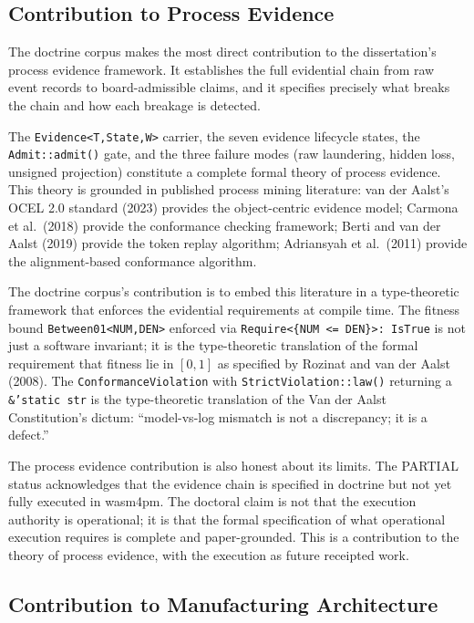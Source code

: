 \subsection{Contribution to Process Evidence}
\label{sec:doctrine-contribution-evidence}

The doctrine corpus makes the most direct contribution to the dissertation's process evidence
framework. It establishes the full evidential chain from raw event records to board-admissible
claims, and it specifies precisely what breaks the chain and how each breakage is detected.

The \texttt{Evidence\textless{}T,State,W\textgreater{}} carrier, the seven evidence lifecycle
states, the \texttt{Admit::admit()} gate, and the three failure modes (raw laundering, hidden
loss, unsigned projection) constitute a complete formal theory of process evidence. This
theory is grounded in published process mining literature: van der Aalst's OCEL 2.0 standard
(2023) provides the object-centric evidence model; Carmona et al.\ (2018) provide the
conformance checking framework; Berti and van der Aalst (2019) provide the token replay
algorithm; Adriansyah et al.\ (2011) provide the alignment-based conformance algorithm.

The doctrine corpus's contribution is to embed this literature in a type-theoretic framework
that enforces the evidential requirements at compile time. The fitness bound
\texttt{Between01\textless{}NUM,DEN\textgreater{}} enforced via \texttt{Require\textless{}\{NUM
<= DEN\}\textgreater{}: IsTrue} is not just a software invariant; it is the type-theoretic
translation of the formal requirement that fitness lie in $[0,1]$ as specified by Rozinat
and van der Aalst (2008). The \texttt{ConformanceViolation} with \texttt{StrictViolation::law()}
returning a \texttt{\&'static str} is the type-theoretic translation of the Van der Aalst
Constitution's dictum: ``model-vs-log mismatch is not a discrepancy; it is a defect.''

The process evidence contribution is also honest about its limits. The PARTIAL status
acknowledges that the evidence chain is specified in doctrine but not yet fully executed in
wasm4pm. The doctoral claim is not that the execution authority is operational; it is that
the formal specification of what operational execution requires is complete and paper-grounded.
This is a contribution to the theory of process evidence, with the execution as future
receipted work.

\subsection{Contribution to Manufacturing Architecture}
\label{sec:doctrine-contribution-manufacturing}

